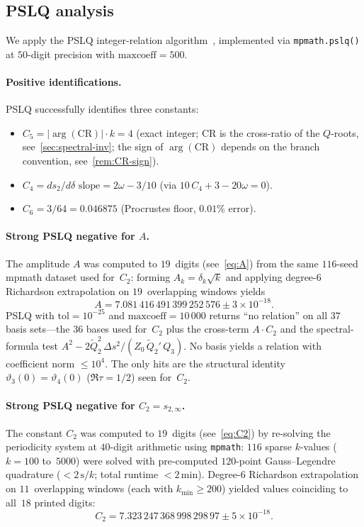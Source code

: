 \documentclass[11pt,a4paper]{article}
\theoremstyle{plain}
\theoremstyle{definition}
\theoremstyle{remark}
\newcommand{\vt}[1]{\vartheta_{#1}}     %
\begin{document}
\subsection{PSLQ analysis}\label{sec:pslq}
We apply the PSLQ integer-relation algorithm~\cite{Fer99}, implemented
via \texttt{mpmath.pslq()} at $50$-digit precision with
$\mathrm{maxcoeff} = 500$.

\paragraph{Positive identifications.}
PSLQ successfully identifies three constants:
\begin{itemize}[nosep]
\item $C_5 = \lvert\arg(\mathrm{CR})\rvert \cdot k = 4$ (exact integer;
  $\mathrm{CR}$ is the cross-ratio of the $Q$-roots,
  see~\cref{sec:spectral-inv}; the sign of $\arg(\mathrm{CR})$
  depends on the branch convention, see~\cref{rem:CR-sign}).
\item $C_4 = ds_2/d\delta \text{ slope} = 2\omega - 3/10$\quad
  (via $10\,C_4 + 3 - 20\omega = 0$).
\item $C_6 = 3/64 = 0.046875$ (Procrustes floor, $0.01\%$ error).
\end{itemize}

\paragraph{Strong PSLQ negative for $A$.}
The amplitude $A$ was computed to $19$~digits
(see~\eqref{eq:A}) from the same $116$-seed mpmath dataset
used for~$C_2$: forming $A_k = \delta_k\sqrt{k}$ and applying
degree-$6$ Richardson extrapolation on $19$~overlapping windows
yields
\[
  A = 7.081\,416\,491\,399\,252\,576 \pm 3 \times 10^{-18}.
\]
PSLQ with $\mathrm{tol} = 10^{-25}$ and
$\mathrm{maxcoeff} = 10\,000$ returns ``no relation''
on all $37$ basis sets---the $36$ bases used for~$C_2$
plus the cross-term $A \cdot C_2$ and the spectral-formula
test $A^2 - 2\tilde Q_2^2\,\Delta s^2/(Z_0\,\tilde Q_2'\,Q_3)$.
No basis yields a relation with coefficient norm $\leq 10^4$.
The only hits are the structural identity
$\vt{3}(0) = \vt{4}(0)$ ($\Re \tau = 1/2$)
seen for~$C_2$.

\paragraph{Strong PSLQ negative for $C_2 = s_{2,\infty}$.}
The constant $C_2$ was computed to $19$~digits
(see~\eqref{eq:C2}) by re-solving the periodicity system at
$40$-digit arithmetic using \texttt{mpmath}:
$116$ sparse $k$-values ($k = 100$ to~$5000$) were solved
with pre-computed $120$-point Gauss--Legendre quadrature
($<2\,\text{s}/k$; total runtime $< 2\,\text{min}$).
Degree-$6$ Richardson extrapolation on $11$~overlapping windows
(each with $k_{\min} \geq 200$) yielded values coinciding to
all~$18$ printed digits:
\[
  C_2 = 7.323\,247\,368\,998\,298\,97 \pm 5 \times 10^{-18}.
\]
\end{document}
